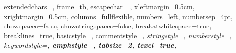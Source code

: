 \fancyhead[C]{\mymarks}
\fancyfoot[C]{\thepage}
\setcounter{secnumdepth}{2}
\usepackage{totcount}
\usepackage{enumitem}
\usepackage[margin=5pt,font={small, singlespacing}, labelfont={small}, justification=centering, labelsep=period]{caption}
\captionsetup{belowskip=0pt}
\usepackage[numbers]{natbib}
\usepackage{bibentry}
\ifx\undefined\selectlanguageifdefined
\def\selectlanguageifdefined#1{}\else\fi
\ifx\undefined\BibEmph
\def\BibEmph#1{\emph{#1}}\else\fi
\usepackage{tikz}
\usetikzlibrary{tikzmark}
\usetikzlibrary{trees, calc, automata}
\usetikzlibrary{arrows,arrows.meta, shapes}
\usetikzlibrary{positioning}

\usepackage{listings}

\lstset
{
		extendedchars=\true, %
		frame=tb, %
		escapechar=|, %
		xleftmargin=0.5cm,
		xrightmargin=0.5cm,
		columns=fullflexible,
		numbers=left,                    %
		numbersep=4pt,                   %
		showspaces=false,
		showstringspaces=false,
		breakatwhitespace=true,         %
		breaklines=true,                 %
		basicstyle=\color{black}\small\sffamily,%
		commentstyle=\color{gray}\itshape, %
		stringstyle=\color{orange},
		numberstyle=\footnotesize\color{gray},
		keywordstyle=\color{blue}\bfseries,
		emphstyle={\color{blue}\bfseries},
		tabsize=2,
		texcl=true,
}

